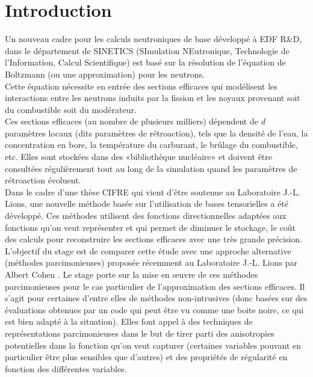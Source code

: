 
\section{Introduction}\label{sec:1}
\hspace{0.5cm}
Un nouveau cadre pour les calculs neutroniques de base développé à EDF R\&D, dans
le département de SINETICS (SImulation NEutronique, Technologie de l'Information,
Calcul Scientifique) est basé sur la résolution de l'équation de Boltzmann
(ou une approximation) pour les neutrons.\\
Cette équation nécessite en entrée des sections efficaces qui modélisent les
interactions entre les neutrons induits par la fission et les noyaux provenant
soit du combustible soit du modérateur. \\

Ces sections efficaces (au nombre de plusieurs milliers) dépendent
de $d$ paramètres locaux (dits paramètres de rétroaction), tels que la densité de l'eau,
la concentration en bore, la température du carburant, le brûlage du combustible, etc.
Elles sont stockées dans des «bibliothèque nucléaire» et doivent être consultées
régulièrement tout au long de la simulation quand les paramètres de rétroaction évoluent. \\

Dans le cadre d’une thèse CIFRE \cite{These} qui vient d’être soutenue au
Laboratoire J.-L. Lions, une nouvelle méthode \cite{Luu} basée sur l’utilisation
de bases tensorielles a été développé. Ces méthodes utilisent des fonctions directionnelles
adaptées aux fonctions qu’on veut représenter et qui permet de diminuer le stockage, le coût
des calculs pour reconstruire les sections efficaces avec une très grande précision. \\

L'objectif du stage est de comparer cette étude avec une approche alternative (méthodes parcimonieuses)
proposée récemment au Laboratoire J.-L. Lions par Albert Cohen \cite{Albert}.
Le stage porte sur la mise en œuvre de ces méthodes parcimonieuses pour le cas particulier de l'approximation
des sections efficaces. Il s'agit pour certaines d'entre elles de méthodes non-intrusives (donc basées sur
des évaluations obtenues par un code qui peut être vu comme une boite noire,
ce qui est bien adapté à la situation). Elles font appel à des techniques de représentations parcimonieuses
dans le but de tirer parti des anisotropies potentielles dans la fonction qu'on veut capturer
(certaines variables pouvant en particulier être plus sensibles que d'autres) et des propriétés
de régularité en fonction des différentes variables.

